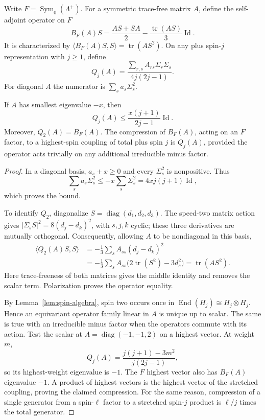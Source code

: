 Write $F=\operatorname{Sym}_0(\Lambda^+)$. For a symmetric trace-free
matrix $A$, define the self-adjoint operator on $F$
\[
 B_F(A)S=\frac{AS+SA}{2}
         -\frac{\operatorname{tr}(AS)}3\operatorname{Id}.
\]
It is characterized by
$\langle B_F(A)S,S\rangle=\operatorname{tr}(AS^2)$.
On any plus spin-$j$ representation with $j\ge1$, define
\[
 Q_j(A)=\frac{\sum_{r,s}A_{rs}\Sigma_r\Sigma_s}{4j(2j-1)}.
\]
For diagonal $A$ the numerator is $\sum_s a_s\Sigma_s^2$.

\begin{lemma}
\label{lem:quadratic-curvature-action}
If $A$ has smallest eigenvalue $-x$, then
\[
 Q_j(A)\le \frac{x(j+1)}{2j-1}\operatorname{Id}.
\]
Moreover, $Q_2(A)=B_F(A)$. The compression of $B_F(A)$, acting on an
$F$ factor, to a highest-spin coupling of total plus spin $j$ is
$Q_j(A)$, provided the operator acts trivially on any additional
irreducible minus factor.
\end{lemma}

\begin{proof}
In a diagonal basis, $a_s+x\ge0$ and every $\Sigma_s^2$ is
nonpositive. Thus
\[
 \sum_s a_s\Sigma_s^2
 \le -x\sum_s\Sigma_s^2
 =4xj(j+1)\operatorname{Id},
\]
which proves the bound.

To identify $Q_2$, diagonalize $S=\operatorname{diag}(d_1,d_2,d_3)$.
The speed-two matrix action gives
$|\Sigma_sS|^2=8(d_j-d_k)^2$, with $s,j,k$ cyclic; these three
derivatives are mutually orthogonal. Consequently, allowing $A$
to be nondiagonal in this basis,
\[
 \begin{aligned}
 \langle Q_2(A)S,S\rangle
 &=-\frac13\sum_s A_{ss}(d_j-d_k)^2\\
 &=-\frac13\sum_s A_{ss}
       \bigl(2\operatorname{tr}(S^2)-3d_s^2\bigr)
 =\operatorname{tr}(AS^2).
 \end{aligned}
\]
Here trace-freeness of both matrices gives the middle identity and
removes the scalar term. Polarization proves the operator equality.

By Lemma~\ref{lem:spin-algebra}, spin two occurs once in
$\operatorname{End}(H_j)\cong H_j\otimes H_j$. Hence an equivariant
operator family linear in $A$ is unique up to scalar. The same is
true with an irreducible minus factor when the operators commute
with its action. Test the scalar at
$A=\operatorname{diag}(-1,-1,2)$ on a highest vector. At weight $m$,
\[
 Q_j(A)=\frac{j(j+1)-3m^2}{j(2j-1)},
\]
so its highest-weight eigenvalue is $-1$. The $F$ highest vector
also has $B_F(A)$ eigenvalue $-1$. A product of highest vectors is
the highest vector of the stretched coupling, proving the claimed
compression. For the same reason, compression of a single generator
from a spin-$\ell$ factor to a stretched spin-$j$ product is
$\ell/j$ times the total generator.
\end{proof}

